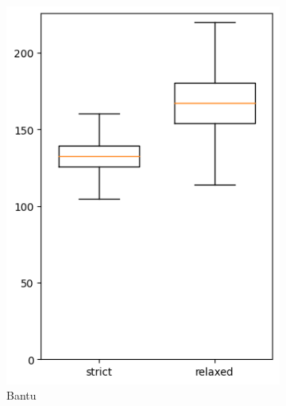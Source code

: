 \documentclass[a4paper,12pt]{scrartcl}
\begin{document}
\begin{figure}
\begin{subfigure}{0.4\textwidth}
    \includegraphics[width=\textwidth]{supplement/analysis/bantu_years_per_split.png}
    \caption{Bantu}
  \end{subfigure}
  \begin{subfigure}{0.4\textwidth}

\end{subfigure}
\end{figure}
\end{document}
